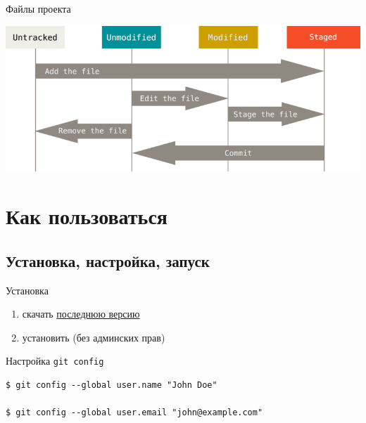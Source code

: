 \documentclass[presentation]{beamer}
\begin{document}
\begin{frame}[label={sec:org3fdff3a}]{Файлы проекта}
\begin{center}
\includegraphics[width=.9\linewidth]{./01_vcs_01_git_file_states.png}
\end{center}
\end{frame}

\section{Как пользоваться}
\label{sec:org92d50fa}
\subsection{Установка, настройка, запуск}
\label{sec:orgc3b3b41}
\begin{frame}[label={sec:org2c43710}]{Установка}
\begin{enumerate}
\item скачать \href{https://git-scm.com/download/win}{последнюю версию}
\item установить (без админских прав)
\end{enumerate}
\end{frame}

\begin{frame}[fragile,label={sec:orgff4b08a}]{Настройка}
 \alert{\texttt{git config}}

\begin{verbatim}
$ git config --global user.name "John Doe"

$ git config --global user.email "john@example.com"
\end{verbatim}
\end{frame}
\end{document}
